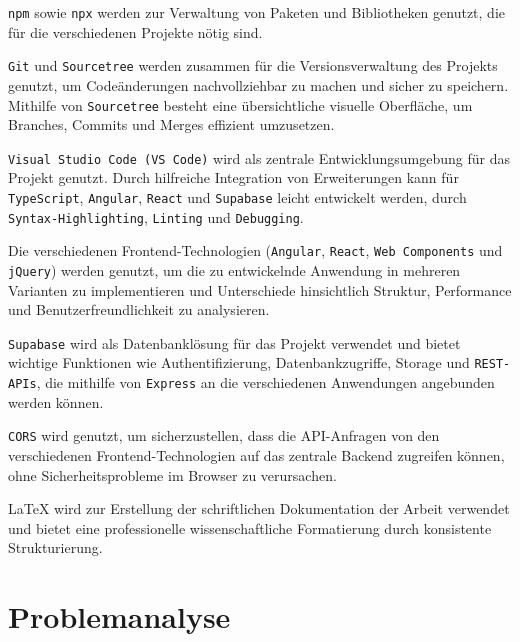 \documentclass[oneside]{ausarbeitung}
\begin{document}
\texttt{npm} sowie \texttt{npx} werden zur Verwaltung von Paketen und Bibliotheken genutzt, die für die verschiedenen Projekte nötig sind.  

\texttt{Git} und \texttt{Sourcetree} werden zusammen für die Versionsverwaltung des Projekts genutzt, um Codeänderungen nachvollziehbar zu machen und sicher zu speichern. Mithilfe von \texttt{Sourcetree} besteht eine übersichtliche visuelle Oberfläche, um Branches, Commits und Merges effizient umzusetzen.  

\texttt{Visual Studio Code (VS Code)} wird als zentrale Entwicklungsumgebung für das Projekt genutzt. Durch hilfreiche Integration von Erweiterungen kann für \texttt{TypeScript}, \texttt{Angular}, \texttt{React} und \texttt{Supabase} leicht entwickelt werden, durch \texttt{Syntax-Highlighting}, \texttt{Linting} und \texttt{Debugging}.  

Die verschiedenen Frontend-Technologien (\texttt{Angular}, \texttt{React}, \texttt{Web Components} und \texttt{jQuery}) werden genutzt, um die zu entwickelnde Anwendung in mehreren Varianten zu implementieren und Unterschiede hinsichtlich Struktur, Performance und Benutzerfreundlichkeit zu analysieren.  

\texttt{Supabase} wird als Datenbanklösung für das Projekt verwendet und bietet wichtige Funktionen wie Authentifizierung, Datenbankzugriffe, Storage und \texttt{REST-APIs}, die mithilfe von \texttt{Express} an die verschiedenen Anwendungen angebunden werden können.  

\texttt{CORS} wird genutzt, um sicherzustellen, dass die API-Anfragen von den verschiedenen Frontend-Technologien auf das zentrale Backend zugreifen können, ohne Sicherheitsprobleme im Browser zu verursachen.  

\LaTeX{} wird zur Erstellung der schriftlichen Dokumentation der Arbeit verwendet und bietet eine professionelle wissenschaftliche Formatierung durch konsistente Strukturierung.  

\chapter{Problemanalyse}
\label{cha:problemanalyse}
\end{document}
